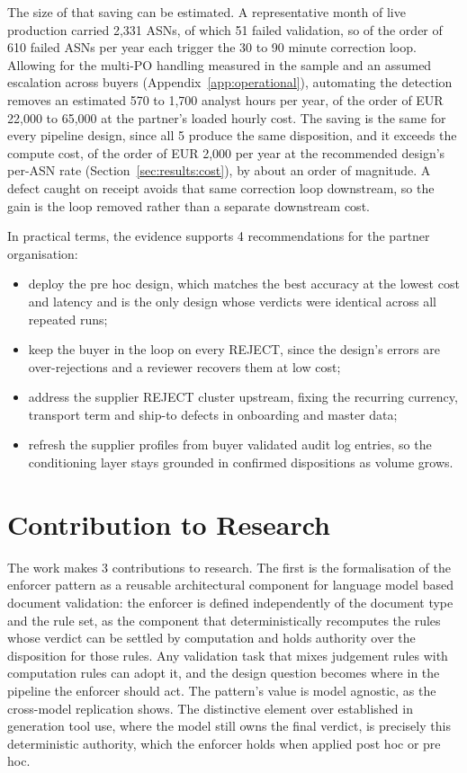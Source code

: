 The size of that saving can be estimated. A representative month of live production carried 2,331 ASNs, of which 51 failed validation, so of the order of 610 failed ASNs per year each trigger the 30 to 90 minute correction loop. Allowing for the multi-PO handling measured in the sample and an assumed escalation across buyers (Appendix~\ref{app:operational}), automating the detection removes an estimated 570 to 1,700 analyst hours per year, of the order of EUR 22,000 to 65,000 at the partner's loaded hourly cost. The saving is the same for every pipeline design, since all 5 produce the same disposition, and it exceeds the compute cost, of the order of EUR 2,000 per year at the recommended design's per-ASN rate (Section~\ref{sec:results:cost}), by about an order of magnitude. A defect caught on receipt avoids that same correction loop downstream, so the gain is the loop removed rather than a separate downstream cost.

In practical terms, the evidence supports 4 recommendations for the partner organisation:
\begin{itemize}
  \item deploy the pre hoc design, which matches the best accuracy at the lowest cost and latency and is the only design whose verdicts were identical across all repeated runs;
  \item keep the buyer in the loop on every REJECT, since the design's errors are over-rejections and a reviewer recovers them at low cost;
  \item address the supplier REJECT cluster upstream, fixing the recurring currency, transport term and ship-to defects in onboarding and master data;
  \item refresh the supplier profiles from buyer validated audit log entries, so the conditioning layer stays grounded in confirmed dispositions as volume grows.
\end{itemize}

\section{Contribution to Research}
\label{sec:concl:research}

The work makes 3 contributions to research. The first is the formalisation of the enforcer pattern as a reusable architectural component for language model based document validation: the enforcer is defined independently of the document type and the rule set, as the component that deterministically recomputes the rules whose verdict can be settled by computation and holds authority over the disposition for those rules. Any validation task that mixes judgement rules with computation rules can adopt it, and the design question becomes where in the pipeline the enforcer should act. The pattern's value is model agnostic, as the cross-model replication shows. The distinctive element over established in generation tool use, where the model still owns the final verdict, is precisely this deterministic authority, which the enforcer holds when applied post hoc or pre hoc.

